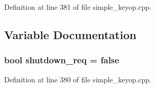 \-Definition at line 381 of file simple\-\_\-keyop.\-cpp.



\subsection{\-Variable \-Documentation}
\subsubsection[{shutdown\-\_\-req}]{\setlength{\rightskip}{0pt plus 5cm}bool {\bf shutdown\-\_\-req} = false}\label{simple__keyop_8cpp_ad848ea54585ac98c0b4fc4c0fe4ef236}


\-Definition at line 380 of file simple\-\_\-keyop.\-cpp.

